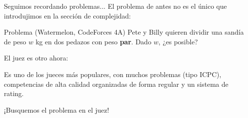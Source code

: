 \documentclass{beamer}
\begin{document}
    \begin{frame}{Seguimos recordando problemas...}
        El problema de antes no es el único que introdujimos en la sección de complejidad: \pause

        \begin{block}{Problema (Watermelon, CodeForces 4A)}
            Pete y Billy quieren dividir una sandía de peso $w$ kg en dos pedazos con peso \textbf{par}. Dado $w$, ¿es posible?
        \end{block} \pause

        El juez es otro ahora: \pause

        \begin{center}
            \href{https://codeforces.com/}{}
        \end{center} \pause 

        Es uno de los jueces más populares, con muchos problemas (tipo ICPC), competencias de alta calidad organizadas de forma regular y un sistema de rating. \pause \vspace{-4pt}

        \begin{center}
            \LARGE
            ¡Busquemos el problema en el juez!
        \end{center}
    \end{frame}
\end{document}
